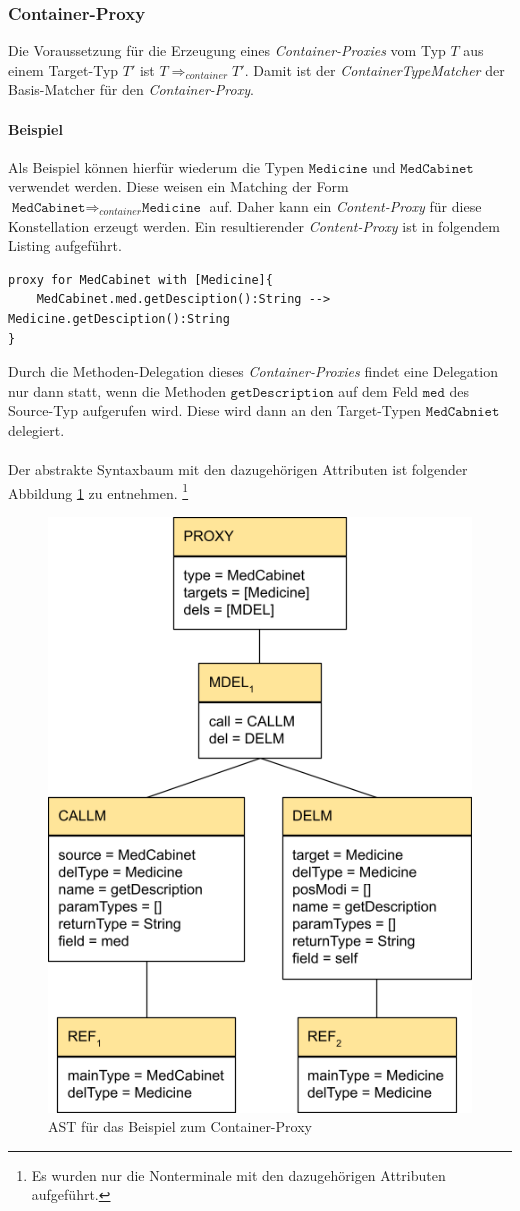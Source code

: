 \documentclass[a4paper,12pt]{article}
\begin{document}
\subsubsection{Container-Proxy}
Die Voraussetzung für die Erzeugung eines \emph{Container-Proxies} vom Typ $T$ aus einem Target-Typ $T'$ ist $T \Rightarrow_{container} T'$. Damit ist der \emph{ContainerTypeMatcher} der Basis-Matcher für den \emph{Container-Proxy}.
\paragraph{Beispiel}
Als Beispiel können hierfür wiederum die Typen $\texttt{Medicine}$ und $\texttt{MedCabinet}$ verwendet werden. Diese weisen ein Matching der Form $\texttt{MedCabinet} \Rightarrow_{container} \texttt{Medicine}$ auf. Daher kann ein \emph{Content-Proxy} für diese Konstellation erzeugt werden. Ein resultierender \emph{Content-Proxy} ist in folgendem Listing aufgeführt.
\begin{lstlisting}[style = dsl]
proxy for MedCabinet with [Medicine]{
	MedCabinet.med.getDesciption():String --> Medicine.getDesciption():String
}
\end{lstlisting}
Durch die Methoden-Delegation dieses \emph{Container-Proxies} findet eine Delegation nur dann statt, wenn die Methoden $\texttt{getDescription}$ auf dem Feld $\texttt{med}$ des Source-Typ aufgerufen wird. Diese wird dann an den Target-Typen $\texttt{MedCabniet}$ delegiert.\\\\
Der abstrakte Syntaxbaum mit den dazugehörigen Attributen ist folgender Abbildung \ref{fig:ASTCONTAINER} zu entnehmen. \footnote{Es wurden nur die Nonterminale mit den dazugehörigen Attributen aufgeführt.}
\begin{figure}[h!]
\centering
\includegraphics[width=0.5\linewidth]{AST_ContainerExample}
\caption{AST für das Beispiel zum Container-Proxy}
\label{fig:ASTCONTAINER}
\end{figure}
\noindent
\end{document}
